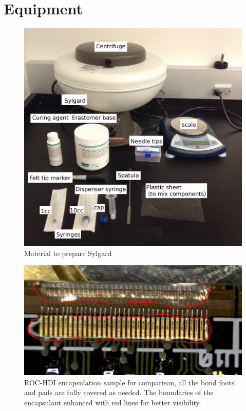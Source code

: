 \documentclass[12pt]{unlsilabsop}
\begin{document}
\section{Equipment}
\begin{figure}[ht]
    \begin{center}
        \includegraphics[scale= 0.3]{img/potting_materials.jpg}
        \caption{Material to prepare Sylgard}
        \label{fig:pottingmaterial}
    \end{center}
\end{figure}

\begin{figure}[ht]
  \begin{center}
    \includegraphics[width=\textwidth]{img/potting_reference.jpg}
    \caption{ROC-HDI encapsulation sample for comparison, all the bond foots and pads are fully covered as needed. The boundaries of the encapsulant enhanced with red lines for better visibility.}
    \label{fig:potting_reference}
  \end{center}
\end{figure}
\end{document}
